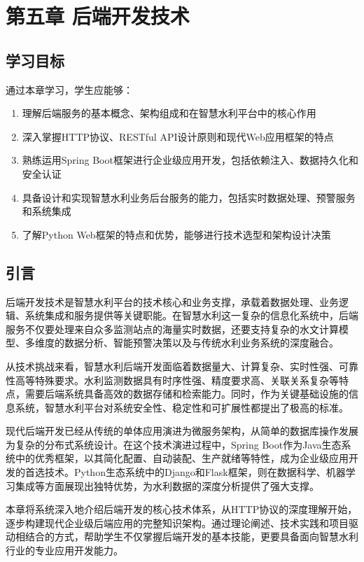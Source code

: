 \chapter{第五章 后端开发技术}

\section{学习目标}

通过本章学习，学生应能够：

\begin{enumerate}
\def\labelenumi{\arabic{enumi}.}
\tightlist
\item
  理解后端服务的基本概念、架构组成和在智慧水利平台中的核心作用
\item
  深入掌握HTTP协议、RESTful API设计原则和现代Web应用框架的特点
\item
  熟练运用Spring Boot框架进行企业级应用开发，包括依赖注入、数据持久化和安全认证
\item
  具备设计和实现智慧水利业务后台服务的能力，包括实时数据处理、预警服务和系统集成
\item
  了解Python Web框架的特点和优势，能够进行技术选型和架构设计决策
\end{enumerate}

\section{引言}

后端开发技术是智慧水利平台的技术核心和业务支撑，承载着数据处理、业务逻辑、系统集成和服务提供等关键职能。在智慧水利这一复杂的信息化系统中，后端服务不仅要处理来自众多监测站点的海量实时数据，还要支持复杂的水文计算模型、多维度的数据分析、智能预警决策以及与传统水利业务系统的深度融合。

从技术挑战来看，智慧水利后端开发面临着数据量大、计算复杂、实时性强、可靠性高等特殊要求。水利监测数据具有时序性强、精度要求高、关联关系复杂等特点，需要后端系统具备高效的数据存储和检索能力。同时，作为关键基础设施的信息系统，智慧水利平台对系统安全性、稳定性和可扩展性都提出了极高的标准。

现代后端开发已经从传统的单体应用演进为微服务架构，从简单的数据库操作发展为复杂的分布式系统设计。在这个技术演进过程中，Spring Boot作为Java生态系统中的优秀框架，以其简化配置、自动装配、生产就绪等特性，成为企业级应用开发的首选技术。Python生态系统中的Django和Flask框架，则在数据科学、机器学习集成等方面展现出独特优势，为水利数据的深度分析提供了强大支撑。

本章将系统深入地介绍后端开发的核心技术体系，从HTTP协议的深度理解开始，逐步构建现代企业级后端应用的完整知识架构。通过理论阐述、技术实践和项目驱动相结合的方式，帮助学生不仅掌握后端开发的基本技能，更要具备面向智慧水利行业的专业应用开发能力。

